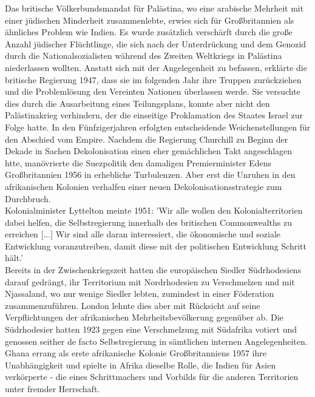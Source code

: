 \documentclass[letterpaper, 12pt]{article}
\begin{document}
Das britische Völkerbundsmandat für Palästina, wo eine arabische Mehrheit mit einer jüdischen Minderheit zusammenlebte, erwies sich für Großbritannien als ähnliches Problem wie Indien. Es wurde zusätzlich verschärft durch die große Anzahl jüdischer Flüchtlinge, die sich nach der Unterdrückung und dem Genozid durch die Nationalsozialisten während des Zweiten Weltkriegs in Palästina niederlassen wollten. Anstatt sich mit der Angelegenheit zu befassen, erklärte die britische Regierung 1947, dass sie im folgenden Jahr ihre Truppen zurückziehen und die Problemlösung den Vereinten Nationen überlassen werde. Sie versuchte dies durch die Ausarbeitung eines Teilungsplans, konnte aber nicht den Palästinakrieg verhindern, der die einseitige Proklamation des Staates Israel zur Folge hatte. \clearpage
In den Fünfzigerjahren erfolgten entscheidende Weichenstellungen für den Abschied vom Empire. Nachdem die Regierung Churchill zu Beginn der Dekade in Sachen Dekolonisation einen eher gemächlichen Takt angeschlagen htte, manövrierte die Suezpolitik den damaligen Premierminister Edens Großbritannien 1956 in erhebliche Turbulenzen. Aber erst die Unruhen in den afrikanischen Kolonien verhalfen einer neuen Dekolonisationsstrategie zum Durchbruch. \\
Kolonialminister Lyttelton meinte 1951: 'Wir alle wollen den Kolonialterritorien dabei helfen, die Selbstregierung innerhalb des britischen Commonwealths zu erreichen [...] Wir sind alle daran interessiert, die ökonomische und soziale Entwicklung voranzutreiben, damit diese mit der politischen Entwicklung Schritt hält.' \\
Bereits in der Zwischenkriegszeit hatten die europäischen Siedler Südrhodesiens darauf gedrängt, ihr Territorium mit Nordrhodesien zu Verschmelzen und mit Njassaland, wo nur wenige Siedler lebten, zumindest in einer Föderation zusammenzuführen. London lehnte dies aber mit Rücksicht auf seine Verpflichtungen der afrikanischen Mehrheitsbevölkerung gegenüber ab. Die Südrhodesier hatten 1923 gegen eine Verschmelzung mit Südafrika votiert und genossen seither de facto Selbstregierung in sämtlichen internen Angelegenheiten. \\
Ghana errang als erste afrikanische Kolonie Großbritanniens 1957 ihre Unabhängigkeit und spielte in Afrika dieselbe Rolle, die Indien für Asien verkörperte - die eines Schrittmachers und Vorbilds für die anderen Territorien unter fremder Herrschaft. \\


\clearpage


\end{document}
